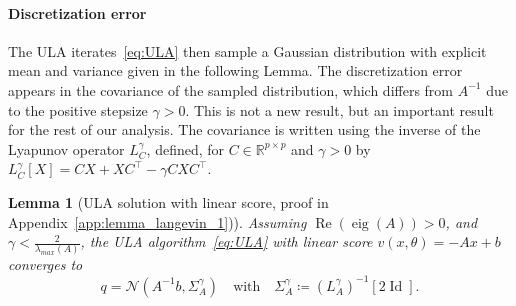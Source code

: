 \documentclass[11pt]{article}
\newtheorem{remark}{Remark}
\newtheorem{lem}{Lemma}
\newcommand{\eqdef}{\coloneqq}
\newcommand{\id}{\operatorname{Id}}
\newcommand{\RR}{\mathbb{R}}
\begin{document}
\paragraph{Discretization error} The ULA iterates~\eqref{eq:ULA} then sample a Gaussian distribution with explicit mean and variance given in the following Lemma. The discretization error
appears in the covariance of the sampled distribution, which differs from $A^{-1}$ due to the positive stepsize $\gamma>0$. This is not a new result, but an important result for the rest of our analysis. The covariance is written using the inverse of the Lyapunov operator $L^\gamma_C$, defined, for $C \in \RR^{p\times p}$ and $\gamma >0$ by $L^\gamma_C[X] = CX + XC^\top - \gamma C X C^\top$.


\begin{lem}[ULA solution with linear score, proof in Appendix~\ref{app:lemma_langevin_1})] \label{lem:lemma_langevin_1}
    Assuming $\operatorname{Re}(\operatorname{eig}(A)) > 0$, and ${\gamma < \frac{2}{\lambda_{max}(A)}}$, the ULA algorithm~\eqref{eq:ULA} with linear score $v(x, \theta) = -A x + b$ converges to 
     \begin{equation*}
    q = \mathcal{N}(A^{-1}b, \Sigma^\gamma_A) \quad \text{with} \quad  \Sigma^\gamma_A \eqdef (L^\gamma_A)^{-1}[2\id].
    \end{equation*}
\end{lem}
\end{document}
